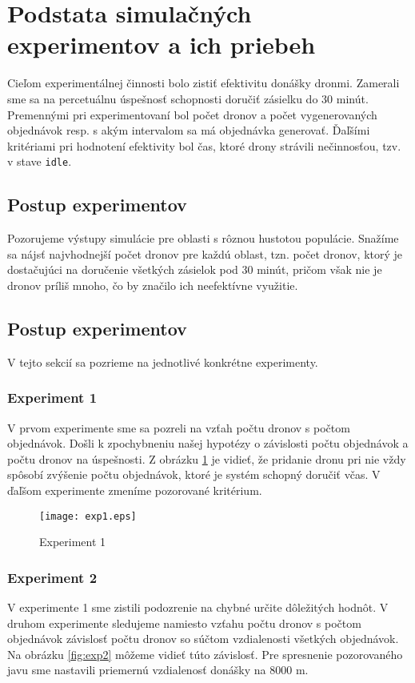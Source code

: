 \documentclass[czech, 12pt, a4paper]{article}
\begin{document}
\section{Podstata simulačných experimentov a ich priebeh}
Cieľom experimentálnej činnosti bolo zistiť efektivitu donášky dronmi. Zamerali sme sa na percetuálnu úspešnosť schopnosti doručiť zásielku do 30 minút. Premennými pri experimentovaní bol počet dronov a počet vygenerovaných objednávok resp. s akým intervalom sa má objednávka generovať. Ďaľšími kritériami pri hodnotení efektivity bol čas, ktoré drony strávili nečinnosťou, tzv. v stave \texttt{idle}. 

\subsection{Postup experimentov}
Pozorujeme výstupy simulácie pre oblasti s rôznou hustotou populácie. Snažíme sa nájsť najvhodnejší počet dronov pre každú oblast, tzn. počet dronov, ktorý je dostačujúci na doručenie všetkých zásielok pod 30 minút, pričom však nie je dronov príliš mnoho, čo by značilo ich neefektívne využitie.

\subsection{Postup experimentov}
V tejto sekcií sa pozrieme na jednotlivé konkrétne experimenty.

\subsubsection{Experiment 1}
V prvom experimente sme sa pozreli na vzťah počtu dronov s počtom objednávok. Došli k zpochybneniu našej hypotézy o závislosti počtu objednávok a počtu dronov na úspešnosti. Z obrázku \ref{fig:exp1} je vidieť, že pridanie dronu pri nie vždy spôsobí zvýšenie počtu objednávok, ktoré je systém schopný doručiť včas. V ďaľšom experimente zmeníme pozorované kritérium.

\begin{figure}[h!]
	\texttt{[image: exp1.eps]}
	\caption{Experiment 1}
	\label{fig:exp1}
\end{figure}

\subsubsection{Experiment 2}
V experimente 1 sme zistili podozrenie na chybné určite dôležitých hodnôt. V druhom experimente sledujeme namiesto vzťahu počtu dronov s počtom objednávok závislosť počtu dronov so súčtom vzdialenosti všetkých objednávok. Na obrázku \ref{fig:exp2} môžeme vidieť túto závislosť. Pre spresnenie pozorovaného javu sme nastavili priemernú vzdialenosť donášky na 8000 m.
\end{document}
